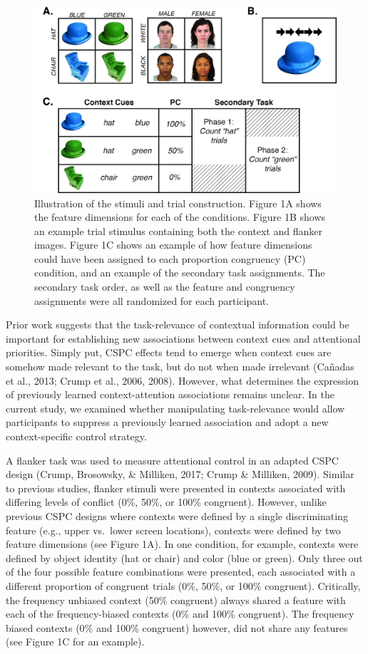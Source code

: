 \documentclass[english,,man,floatsintext]{apa6}
\begin{document}
\begin{figure}
\centering
\includegraphics{images/Task.jpg}
\caption{\label{fig:figure1}Illustration of the stimuli and trial construction. Figure 1A shows the feature dimensions for each of the conditions. Figure 1B shows an example trial stimulus containing both the context and flanker images. Figure 1C shows an example of how feature dimensions could have been assigned to each proportion congruency (PC) condition, and an example of the secondary task assignments. The secondary task order, as well as the feature and congruency assignments were all randomized for each participant.}
\end{figure}



Prior work suggests that the task-relevance of contextual information could be important for establishing new associations between context cues and attentional priorities. Simply put, CSPC effects tend to emerge when context cues are somehow made relevant to the task, but do not when made irrelevant (Cañadas et al., 2013; Crump et al., 2006, 2008). However, what determines the expression of previously learned context-attention associations remains unclear. In the current study, we examined whether manipulating task-relevance would allow participants to suppress a previously learned association and adopt a new context-specific control strategy.

A flanker task was used to measure attentional control in an adapted CSPC design (Crump, Brosowsky, \& Milliken, 2017; Crump \& Milliken, 2009). Similar to previous studies, flanker stimuli were presented in contexts associated with differing levels of conflict (0\%, 50\%, or 100\% congruent). However, unlike previous CSPC designs where contexts were defined by a single discriminating feature (e.g., upper vs.~lower screen locations), contexts were defined by two feature dimensions (see Figure 1A). In one condition, for example, contexts were defined by object identity (hat or chair) and color (blue or green). Only three out of the four possible feature combinations were presented, each associated with a different proportion of congruent trials (0\%, 50\%, or 100\% congruent). Critically, the frequency unbiased context (50\% congruent) always shared a feature with each of the frequency-biased contexts (0\% and 100\% congruent). The frequency biased contexts (0\% and 100\% congruent) however, did not share any features (see Figure 1C for an example).
\end{document}
